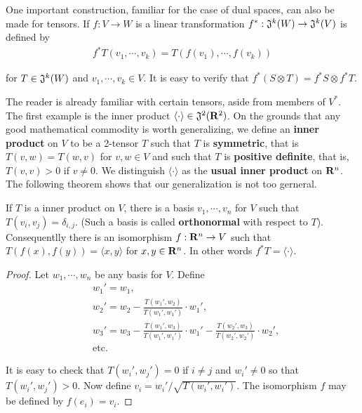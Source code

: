 One important construction, familiar for the case of dual
spaces, can also be made for tensors. If $f:V\to W$ is a 
linear transformation $f^*:\mathfrak{J}^k(W) \to \mathfrak{J}^k(V)$ is defined 
by 
\begin{align*}
    f^*T(v_1, \cdots, v_k) = T(f(v_1), \cdots, f(v_k))
\end{align*}

for $T\in \mathfrak{J}^k(W)$ and $v_1, \cdots, v_k\in V$. It is easy to 
verify that $f^*(S\otimes T) = f^*S\otimes f^*T$.

The reader is already familiar with certain tensors, aside
from members of $V^*$. The first example is the inner product
$\langle\cdot \rangle\in \mathfrak{J}^2(\mathbf{R}^2)$. 
On the grounds that any good mathematical commodity is worth generalizing, 
we define an \textbf{inner product} on $V$ to be a 2-tensor $T$ such that $T$
is \textbf{symmetric}, that is $T(v, w) = T(w, v)$ for $v, w\in V$ and such that 
$T$ is \textbf{positive definite}, that is, $T(v, v)>0$ if $v\neq 0$. We distinguish
$\langle \cdot \rangle$ as the \textbf{usual inner product} on $\mathbf{R}^n$. The following 
theorem shows that our generalization is not too gerneral. 

\begin{theorem}
    If $T$ is a inner product on $V$, there is a basis $v_1, \cdots, v_n$ for $V$ such that 
    $T(v_i, v_j) =\delta_{i,j}$. (Such a basis is called \textbf{orthonormal} with respect to $T$).
    Consequentlly there is an isomorphism $f:\mathbf{R}^n\to V$ such that $T(f(x), f(y)) = \langle x, y\rangle$
    for $x, y\in \mathbf{R}^n$. In other words $f^*T = \langle \cdot\rangle$.
\end{theorem}

\begin{proof}
    Let $w_1, \cdots, w_n$ be any basis for $V$. Define 
    \begin{align*}
        & w_1' = w_1, \\
        & w_2' = w_2 - \frac{T(w_1', w_2)}{T(w_1', w_1')}\cdot w_1',\\
        & w_3' = w_3 - \frac{T(w_1', w_3)}{T(w_1', w_1')}\cdot w_1' 
            - \frac{T(w_2', w_3)}{T(w_2', w_2')}\cdot w_2',\\
        & \text{etc.}
    \end{align*}

    It is easy to check that $T(w_i', w_j') =0$ if $i\neq j$ and $w_i'\neq 0$ so that 
    $T(w_i', w_j') >0$. Now define $v_i = w_i'\big/\sqrt{T(w_i', w_i')}$. The isomorphism
    $f$ may be defined by $f(e_i) = v_i$.
\end{proof}

